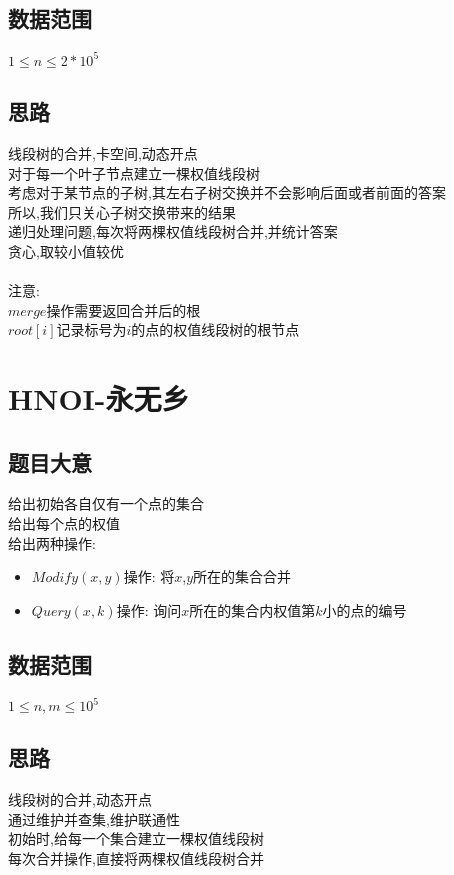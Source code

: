 \documentclass{ctexart}
\numberwithin{equation}{section}
\begin{document}
\begin{flushleft}
  \subsection{数据范围}
  $1\le n\le 2*10^5$\\
  \subsection{思路}
  线段树的合并,卡空间,动态开点\\
  对于每一个叶子节点建立一棵权值线段树\\
  考虑对于某节点的子树,其左右子树交换并不会影响后面或者前面的答案\\
  所以,我们只关心子树交换带来的结果\\
  递归处理问题,每次将两棵权值线段树合并,并统计答案\\
  贪心,取较小值较优\\

  ~\\
  注意:\\
  $merge$操作需要返回合并后的根\\
  $root[i]$记录标号为$i$的点的权值线段树的根节点\\
  \newpage

  \section{HNOI-永无乡}
  \subsection{题目大意}
  给出初始各自仅有一个点的集合\\
  给出每个点的权值\\
  给出两种操作:\\
  \begin{itemize}
  \item $Modify(x,y)$操作: 将$x$,$y$所在的集合合并
  \item $Query(x,k)$操作: 询问$x$所在的集合内权值第$k$小的点的编号
  \end{itemize}
  \subsection{数据范围}
  $1\le n,m\le 10^5$\\
  \subsection{思路}
  线段树的合并,动态开点\\
  通过维护并查集,维护联通性\\
  初始时,给每一个集合建立一棵权值线段树\\
  每次合并操作,直接将两棵权值线段树合并\\


\end{flushleft}
\end{document}
